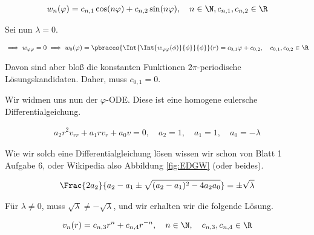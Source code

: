 \begin{solution}
\begin{enumerate}[label = (\roman*)]
    \begin{align*}
        w_n(\varphi)
        =
        c_{n, 1} \cos(n \varphi)
        +
        c_{n, 2} \sin(n \varphi),
        \quad
        n \in \N,
        c_{n, 1}, c_{n, 2} \in \R
    \end{align*}

    Sei nun $\lambda = 0$.

    \begin{align*}
        \implies
        w_{\varphi \varphi} = 0
        \implies
        w_0(\varphi)
        =
        \pbraces
        {
            \Int
            {
                \Int
                {
                    w_{\varphi \varphi}(\phi)
                }{\phi}
            }{\phi}
        }(r)
        =
        c_{0, 1} \varphi + c_{0, 2},
        \quad
        c_{0, 1}, c_{0, 2} \in \R
    \end{align*}

    Davon sind aber bloß die konstanten Funktionen $2 \pi$-periodische Lösungskandidaten.
    Daher, muss $c_{0, 1} = 0$.

    Wir widmen uns nun der $\varphi$-ODE.
    Diese ist eine homogene eulersche Differentialgeichung.

    \begin{align*}
        a_2 r^2 v_{rr}
        +
        a_1 r v_r
        +
        a_0 v = 0,
        \quad
        a_2 = 1, \quad a_1 = 1, \quad a_0 = -\lambda
    \end{align*}

    Wie wir solch eine Differentialgleichung lösen wissen wir schon von Blatt 1 Aufgabe 6, oder Wikipedia also Abbildung \ref{fig:EDGW} (oder beides).

    \begin{align*}
        \Frac
        {2 a_2}
        {
            a_2 - a_1
            \pm
            \sqrt
            {
                (a_2 - a_1)^2
                -
                4 a_2 a_0
            }
        }
        =
        \pm \sqrt{\lambda}
    \end{align*}

    Für $\lambda \neq 0$, muss $\sqrt{\lambda} \neq -\sqrt{\lambda}$, und wir erhalten wir die folgende Lösung.

    \begin{align*}
        v_n(r)
        =
        c_{n, 3} r^n + c_{n, 4} r^{-n},
        \quad
        n \in \N,
        \quad
        c_{n, 3}, c_{n, 4} \in \R
    \end{align*}


\end{enumerate}
\end{solution}
